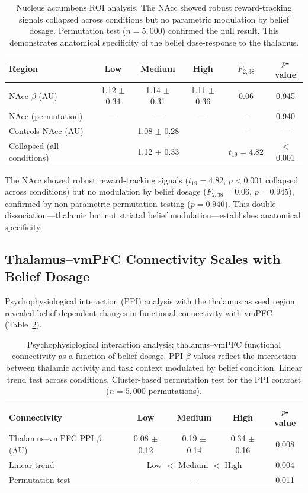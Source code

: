 \documentclass[11pt]{article}
\begin{document}
\begin{table}[H]
\centering
\caption{Nucleus accumbens ROI analysis. The NAcc showed robust reward-tracking signals collapsed across conditions but no parametric modulation by belief dosage. Permutation test ($n = 5{,}000$) confirmed the null result. This demonstrates anatomical specificity of the belief dose-response to the thalamus.}
\label{tab:striatum}
\begin{tabular}{lccccc}
\toprule
\textbf{Region} & \textbf{Low} & \textbf{Medium} & \textbf{High} & \textbf{$F_{2,38}$} & \textbf{$p$-value} \\
\midrule
NAcc $\beta$ (AU) & 1.12 $\pm$ 0.34 & 1.14 $\pm$ 0.31 & 1.11 $\pm$ 0.36 & 0.06 & 0.945 \\
NAcc (permutation) & --- & --- & --- & --- & 0.940 \\
Controls NAcc (AU) & \multicolumn{3}{c}{1.08 $\pm$ 0.28} & --- & --- \\
\midrule
Collapsed (all conditions) & \multicolumn{3}{c}{1.12 $\pm$ 0.33} & $t_{19} = 4.82$ & $<$0.001 \\
\bottomrule
\end{tabular}
\end{table}

The NAcc showed robust reward-tracking signals ($t_{19} = 4.82$, $p < 0.001$ collapsed across conditions) but no modulation by belief dosage ($F_{2,38} = 0.06$, $p = 0.945$), confirmed by non-parametric permutation testing ($p = 0.940$). This double dissociation---thalamic but not striatal belief modulation---establishes anatomical specificity.

\subsection{Thalamus--vmPFC Connectivity Scales with Belief Dosage}

Psychophysiological interaction (PPI) analysis \citep{friston1997} with the thalamus as seed region revealed belief-dependent changes in functional connectivity with vmPFC (Table~\ref{tab:ppi}).

\begin{table}[H]
\centering
\caption{Psychophysiological interaction analysis: thalamus--vmPFC functional connectivity as a function of belief dosage. PPI $\beta$ values reflect the interaction between thalamic activity and task context modulated by belief condition. Linear trend test across conditions. Cluster-based permutation test for the PPI contrast ($n = 5{,}000$ permutations).}
\label{tab:ppi}
\begin{tabular}{lcccc}
\toprule
\textbf{Connectivity} & \textbf{Low} & \textbf{Medium} & \textbf{High} & \textbf{$p$-value} \\
\midrule
Thalamus--vmPFC PPI $\beta$ (AU) & 0.08 $\pm$ 0.12 & 0.19 $\pm$ 0.14 & 0.34 $\pm$ 0.16 & 0.008 \\
Linear trend & \multicolumn{3}{c}{Low $<$ Medium $<$ High} & 0.004 \\
Permutation test & \multicolumn{3}{c}{---} & 0.011 \\
\bottomrule
\end{tabular}
\end{table}
\end{document}
